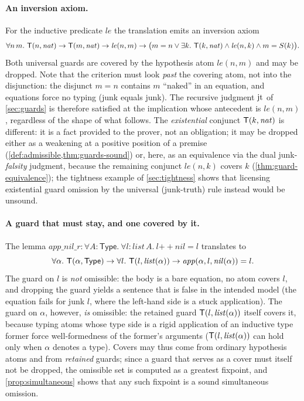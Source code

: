 \paragraph{An inversion axiom.}
For the inductive predicate $\mathit{le}$ the translation emits an inversion
axiom
\[
  \forall n\, m.\ \mathsf{T}(n,\mathit{nat}) \rightarrow \mathsf{T}(m,\mathit{nat}) \rightarrow
  \mathit{le}(n,m) \rightarrow
  \bigl( m = n \vee \exists k.\ \mathsf{T}(k,\mathit{nat}) \wedge \mathit{le}(n,k)
  \wedge m = S(k) \bigr).
\]
Both universal guards are covered by the hypothesis atom
$\mathit{le}(n,m)$ and may be dropped.  Note that the criterion must look
\emph{past} the covering atom, not into the disjunction: the disjunct
$m = n$ contains $m$ ``naked'' in an equation, and equations force no typing
(junk equals junk).  The recursive judgment $\mathrm{jt}$ of \cref{sec:guards} is
therefore satisfied at the implication whose antecedent is
$\mathit{le}(n,m)$, regardless of the shape of what follows.  The
\emph{existential} conjunct $\mathsf{T}(k,\mathit{nat})$ is different: it is a fact
provided to the prover, not an obligation; it may be dropped either as a
weakening at a positive position of a premise
(\cref{def:admissible,thm:guards-sound}) or, here, as an equivalence via the
dual junk-\emph{falsity} judgment, because the remaining conjunct
$\mathit{le}(n,k)$ covers $k$ (\cref{thm:guard-equivalence}); the tightness
example of \cref{sec:tightness} shows that licensing existential guard
omission by the universal (junk-truth) rule instead would be unsound.

\paragraph{A guard that must stay, and one covered by it.}
The lemma $\mathit{app\_nil\_r} : \forall A{:}\mathsf{Type}.\ \forall
l{:}\mathit{list}\,A.\ l \mathbin{+\!\!+} \mathit{nil} = l$ translates to
\[
  \forall \alpha.\ \T(\alpha,\TypeC) \imp \forall l.\
  \T(l, \mathit{list}(\alpha)) \imp
  \mathit{app}(\alpha, l, \mathit{nil}(\alpha)) = l .
\]
The guard on $l$ is \emph{not} omissible: the body is a bare equation, no
atom covers $l$, and dropping the guard yields a sentence that is false in
the intended model (the equation fails for junk $l$, where the left-hand
side is a stuck application).  The guard on $\alpha$, however, \emph{is}
omissible: the retained guard $\mathsf{T}(l,\mathit{list}(\alpha))$ itself covers
it, because typing atoms whose type side is a rigid application of an
inductive type former force well-formedness of the former's arguments
($\mathsf{T}(l,\mathit{list}(\alpha))$ can hold only when $\alpha$ denotes a type).
Covers may thus come from ordinary hypothesis atoms and from \emph{retained}
guards; since a guard that serves as a cover must itself not be dropped, the
omissible set is computed as a greatest fixpoint, and
\cref{prop:simultaneous} shows that any such fixpoint is a sound
simultaneous omission.

